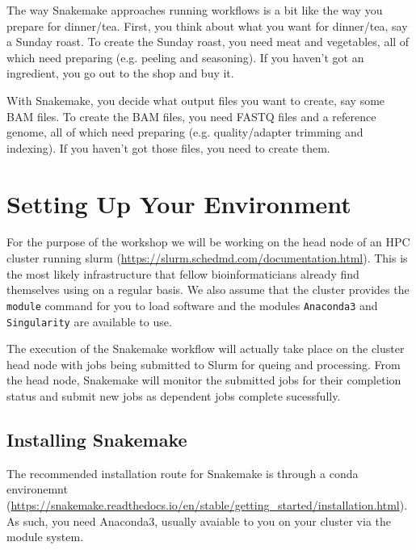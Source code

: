 The way Snakemake approaches running workflows is a bit like the way you prepare for dinner/tea. First, you think about what you
want for dinner/tea, say a Sunday roast. To create the Sunday roast, you need meat and vegetables, all of which need preparing
(e.g. peeling and seasoning). If you haven't got an ingredient, you go out to the shop and buy it.

With Snakemake, you decide what output files you want to create, say some BAM files. To create the BAM files, you need FASTQ files
and a reference genome, all of which need preparing (e.g. quality/adapter trimming and indexing). If you haven't got those files,
you need to create them.


\section{Setting Up Your Environment}

For the purpose of the workshop we will be working on the head node of an HPC cluster running slurm (\url{https://slurm.schedmd.com/documentation.html}).
This is the most likely infrastructure that fellow bioinformaticians already find themselves using
on a regular basis. We also assume that the cluster provides the \texttt{module} command for you to
load software and the modules \texttt{Anaconda3} and \texttt{Singularity} are available to use.

The execution of the Snakemake workflow will actually take place on the cluster head node with jobs
being submitted to Slurm for queing and processing. From the head node, Snakemake will monitor the
submitted jobs for their completion status and submit new jobs as dependent jobs complete sucessfully.

\subsection{Installing Snakemake}

The recommended installation route for Snakemake is through a conda environemnt
(\url{https://snakemake.readthedocs.io/en/stable/getting_started/installation.html}). As such, you need
Anaconda3, usually avaiable to you on your cluster via the module system.

